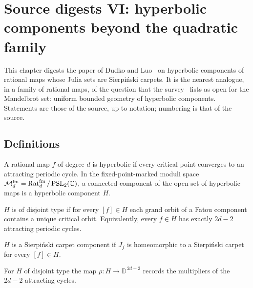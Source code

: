 \chapter[Hyperbolic components beyond the quadratic family]{Source digests VI: hyperbolic components beyond the quadratic family}
\label{ch:digests-sierpinski}

This chapter digests the paper of Dudko and Luo~\cite{DudkoLuoSierpinski} on hyperbolic
components of rational maps whose Julia sets are Sierpi\'nski carpets.  It is the
nearest analogue, in a family of rational maps, of the question that the survey~\cite{DudkoMLC}
lists as open for the Mandelbrot set: uniform bounded geometry of hyperbolic components.
Statements are those of the source, up to notation; numbering is that of the source.

\section{Definitions}
\label{sec:digest-sierpinski-defs}

\begin{definition}
\label{def:sierp-hyperbolic}
A rational map $f$ of degree $d$ is hyperbolic if every critical point converges to an attracting periodic cycle.
In the fixed-point-marked moduli space $\mathcal M^{\rm fm}_d=\operatorname{Rat}^{\rm fm}_d/\operatorname{PSL}_2(\mathbb C)$, a connected component
of the open set of hyperbolic maps is a hyperbolic component $H$.
\end{definition}

\begin{definition}
\label{def:sierp-disjoint}
$H$ is of disjoint type if for every $[f]\in H$ each grand orbit of a Fatou component contains a unique critical orbit.
Equivalently, every $f\in H$ has exactly $2d-2$ attracting periodic cycles.
\end{definition}

\begin{definition}
\label{def:sierp-carpet}
$H$ is a Sierpi\'nski carpet component if $J_f$ is homeomorphic to a Sierpi\'nski carpet for every $[f]\in H$.
\end{definition}

\begin{definition}
\label{def:sierp-multiplier}
For $H$ of disjoint type the map $\rho\colon H\to\mathbb D^{\,2d-2}$ records the multipliers of the $2d-2$ attracting cycles.
\end{definition}

